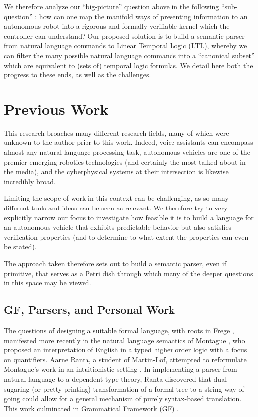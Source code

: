 \documentclass[a4paper, 11pt]{article}
\begin{document}
We therefore analyze our ``big-picture'' question above in the following
``sub-question'' : how can one map the manifold ways of presenting information to an
autonomous robot into a rigorous and formally verifiable kernel which the
controller can understand? Our proposed solution is to build a semantic parser
from natural language commands to Linear Temporal Logic (LTL), whereby we can filter
the many possible natural language commands into a ``canonical subset'' which
are equivalent to (sets of) temporal logic formulas. We detail here both the
progress to these ends, as well as the challenges.

\section{Previous Work} 

This research broaches many different research fields, many of which were
unknown to the author prior to this work. Indeed, voice assistants can
encompass almost any natural language processing task, autonomous vehicles are
one of the premier emerging robotics technologies (and certainly the most talked
about in the media), and the cyberphysical systems at their intersection is
likewise incredibly broad.

Limiting the scope of work in this context can be challenging, as so many
different tools and ideas can be seen as relevant. We therefore try to very
explicitly narrow our focus to investigate how feasible it is to build a
language for an autonomous vehicle that exhibits predictable behavior but also
satisfies verification properties (and to determine to what extent the
properties can even be stated).

The approach taken therefore sets out to build a semantic parser, even if
primitive, that serves as a Petri dish through which many of the deeper questions
in this space may be viewed.

\subsection{GF, Parsers, and Personal Work}

The questions of designing a suitable formal language, with roots in Frege
\cite{frege79}, manifested more recently in the natural language semantics of
Montague \cite{Montague1973}, who proposed an interpretation of English in a
typed higher order logic with a focus on quantifiers. Aarne Ranta, a student of
Martin-Löf, attempted to reformulate Montague's work in an intuitionistic
setting \cite{ranta1994type}. In implementing a parser from natural language to
a dependent type theory, Ranta discovered that dual sugaring (or pretty
printing) transformation of a formal tree to a string way of going could allow
for a general mechanism of purely syntax-based translation. This work culminated
in Grammatical Framework (GF) \cite{ranta_2004}.
\end{document}
